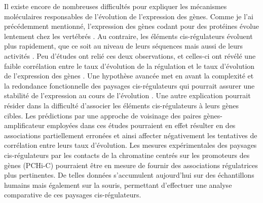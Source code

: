\newpage

Il existe encore de nombreuses difficultés pour expliquer les mécanismes moléculaires responsables de l’évolution de l’expression des gènes. Comme je l’ai précédemment mentionné, l'expression des gènes codant pour des protéines évolue lentement chez les vertébrés \citep{brawand_evolution_2011, necsulea_evolutionary_2014, cardoso-moreira_gene_2019}. Au contraire, les éléments \gls{cis}-régulateurs évoluent plus rapidement, que ce soit au niveau de leurs séquences mais aussi de leurs activités \citep{cheng_principles_2014, villar_enhancer_2015}. Peu d’études ont relié ces deux observations, et celles-ci ont révélé une faible corrélation entre le taux d’évolution de la régulation et le taux d’évolution de l’expression des gènes \citep{wong_interplay_2017, berthelot_complexity_2018}. Une hypothèse avancée met en avant la complexité et la redondance fonctionnelle des paysages \gls{cis}-régulateurs qui pourrait assurer une stabilité de l’expression au cours de l’évolution \citep{osterwalder_enhancer_2018, berthelot_complexity_2018}. Une autre explication pourrait résider dans la difficulté d’associer les éléments \gls{cis}-régulateurs à leurs gènes cibles. Les prédictions par une approche de voisinage des paires gènes-\gls{amplificateur} employées dans ces études pourraient en effet résulter en des associations partiellement erronées et ainsi affecter négativement les tentatives de corrélation entre leurs taux d’évolution. Les mesures expérimentales des paysages \gls{cis}-régulateurs par les contacts de la chromatine centrés sur les promoteurs des gènes (\acrshort{PCHi-C}) pourraient être en mesure de fournir des associations régulatrices plus pertinentes. De telles données s’accumulent aujourd’hui sur des échantillons humains mais également sur la souris, permettant d’effectuer une analyse comparative de ces paysages \gls{cis}-régulateurs.\\

